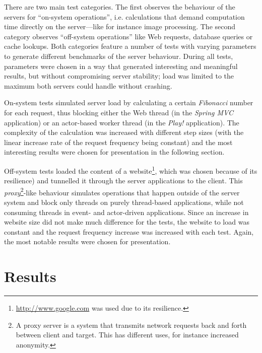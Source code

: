 There are two main test categories. The first observes the behaviour of the servers for ``on-system operations'', i.e. calculations that demand computation time directly on the server---like for instance image processing. The second category observes ``off-system operations'' like Web requests, database queries or cache lookups. Both categories feature a number of tests with varying parameters to generate different benchmarks of the server behaviour. During all tests, parameters were chosen in a way that generated interesting and meaningful results, but without compromising server stability; load was limited to the maximum both servers could handle without crashing.

On-system tests simulated server load by calculating a certain \textit{Fibonacci} number for each request, thus blocking either the Web thread (in the \textit{Spring MVC} application) or an actor-based worker thread (in the \textit{Play!} application). The complexity of the calculation was increased with different step sizes (with the linear increase rate of the request frequency being constant) and the most interesting results were chosen for presentation in the following section. 

Off-system tests loaded the content of a website\footnote{\url{http://www.google.com} was used due to its resilience.}, which was chosen because of its resilience) and tunnelled it through the server applications to the client. This \textit{proxy}\footnote{A proxy server is a system that transmits network requests back and forth between client and target. This has different uses, for instance increased anonymity.}-like behaviour simulates operations that happen outside of the server system and block only threads on purely thread-based applications, while not consuming threads in event- and actor-driven applications. Since an increase in website size did not make much difference for the tests, the website to load was constant and the request frequency increase was increased with each test. Again, the most notable results were chosen for presentation.

\section{Results}
